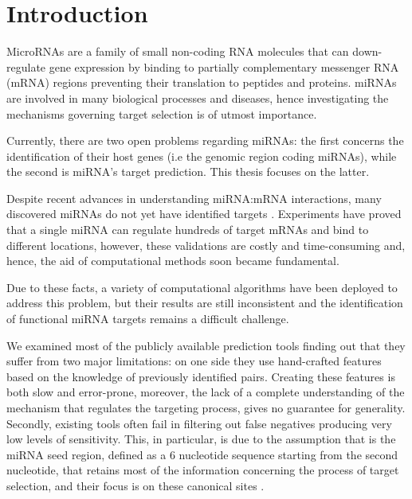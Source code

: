 
\chapter{Introduction} %

\label{Intro} %


\newcommand{\keyword}[1]{\textbf{#1}}
\newcommand{\tabhead}[1]{\textbf{#1}}
\newcommand{\code}[1]{\texttt{#1}}
\newcommand{\file}[1]{\texttt{\bfseries#1}}
\newcommand{\option}[1]{\texttt{\itshape#1}}

MicroRNAs are a family of small non-coding RNA molecules that can down-regulate gene expression by binding to partially complementary messenger RNA (mRNA) regions preventing their translation to peptides and proteins. miRNAs are involved in many biological processes and diseases, hence investigating the mechanisms governing target selection is of utmost importance. 

Currently, there are two open problems regarding miRNAs: the first concerns the identification of their host genes (i.e the genomic region coding miRNAs), while the second is miRNA's target prediction. This thesis focuses on the latter.

Despite recent advances in understanding miRNA:mRNA interactions, many discovered miRNAs do not yet have identified targets \cite{perfect_matching}. Experiments have proved that a single miRNA can regulate hundreds of target mRNAs and bind to different locations, however, these validations are costly and time-consuming and, hence, the aid of computational methods soon became fundamental.

Due to these facts, a variety of computational algorithms have been deployed to address this problem, but their results are still inconsistent and the identification of functional miRNA targets remains a difficult challenge.

We examined most of the publicly available prediction tools finding out that they suffer from two major limitations: on one side they use hand-crafted features based on the knowledge of previously identified pairs. Creating these features is both slow and error-prone, moreover, the lack of a complete understanding of the mechanism that regulates the targeting process, gives no guarantee for generality. Secondly, existing tools often fail in filtering out false negatives producing very low levels of sensitivity. This, in particular, is due to the assumption that is the miRNA seed region, defined as a 6 nucleotide sequence starting from the second nucleotide, that retains most of the information concerning the process of target selection, and their focus is on these canonical sites \cite{canonical_target}.    

